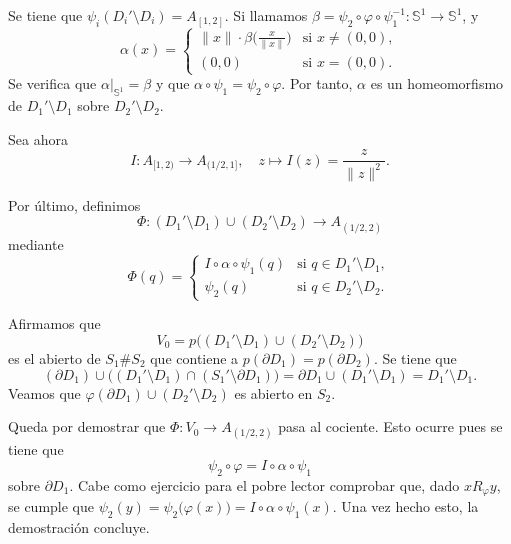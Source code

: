 {    Se tiene que \(\psi_i(D_i' \setminus D_i) = A_{[1,2]} \). Si llamamos \(\beta = \psi_2 \circ \varphi \circ \psi_1^{-1} : \mathbb{S}^1 \to \mathbb{S}^1 \), y
    \[
    \alpha(x) =
    \begin{cases}
    \|x\| \cdot \beta\Big(\frac{x}{\|x\|}\Big) & \text{si } x \neq (0, 0), \\
    (0,0) & \text{si } x = (0, 0).
    \end{cases}
    \]
    Se verifica que \( \alpha\vert_{\mathbb{S}^1} = \beta\) y que \(\alpha \circ \psi_1 = \psi_2 \circ \varphi\). Por tanto, \(\alpha\) es un homeomorfismo de \(D_1' \setminus D_1\) sobre \(D_2' \setminus D_2\).

    Sea ahora 
    \[
    I : A_{[1, 2)} \to A_{(1/2, 1]},\quad z \mapsto I(z) = \frac{z}{\|z\|^2}.
    \]

    Por último, definimos 
    \[
    \Phi : (D_1' \setminus D_1) \cup (D_2' \setminus D_2) \to A_{(1/2, 2)}
    \]
    mediante
    \[
    \Phi(q) = 
    \begin{cases}
    I \circ \alpha \circ \psi_1(q) & \text{si } q \in D_1' \setminus D_1, \\
    \psi_2(q) & \text{si } q \in D_2' \setminus D_2.
    \end{cases}
    \]

    Afirmamos que 
    \[
    V_0 = p\big((D_1' \setminus D_1) \cup (D_2' \setminus D_2)\big)
    \]
    es el abierto de \(S_1 \# S_2\) que contiene a \(p(\partial D_1) = p(\partial D_2)\). Se tiene que 
    \[
    (\partial D_1)\cup \big((D_1' \setminus D_1) \cap (S_1' \setminus \partial D_1)\big) = \partial D_1 \cup (D_1' \setminus D_1) = D_1'\setminus D_1.
    \]
    Veamos que \(\varphi(\partial D_1) \cup (D_2'\setminus D_2) \) es abierto en \(S_2\).

    Queda por demostrar que 
    \(\Phi : V_0 \to A_{(1/2, 2)}\) pasa al cociente. Esto ocurre pues se tiene que 
    \[
    \psi_2 \circ \varphi = I \circ \alpha \circ \psi_1
    \]
    sobre \(\partial D_1\). Cabe como ejercicio para el pobre lector comprobar que, dado \(x R_\varphi y\), se cumple que \(\psi_2(y) = \psi_2\big(\varphi(x)\big) = I \circ \alpha \circ \psi_1(x)\). Una vez hecho esto, la demostración concluye.  
}
